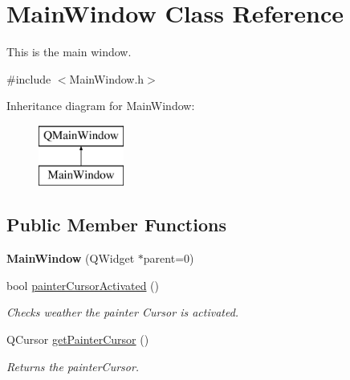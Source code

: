\hypertarget{class_main_window}{}\section{Main\+Window Class Reference}
\label{class_main_window}


This is the main window.  




{\ttfamily \#include $<$Main\+Window.\+h$>$}

Inheritance diagram for Main\+Window\+:\begin{figure}[H]
\begin{center}
\leavevmode
\includegraphics[height=2.000000cm]{class_main_window}
\end{center}
\end{figure}
\subsection*{Public Member Functions}
\begin{DoxyCompactItemize}
\item 
\hypertarget{class_main_window_a8b244be8b7b7db1b08de2a2acb9409db}{}{\bfseries Main\+Window} (Q\+Widget $\ast$parent=0)\label{class_main_window_a8b244be8b7b7db1b08de2a2acb9409db}

\item 
bool \hyperlink{class_main_window_a0f6f0466e2aca15edd6c820a686c6b57}{painter\+Cursor\+Activated} ()
\begin{DoxyCompactList}\small\item\em Checks weather the painter Cursor is activated. \end{DoxyCompactList}\item 
\hypertarget{class_main_window_aa0e9c2933778a0a94a2d2010b28ee0f2}{}Q\+Cursor \hyperlink{class_main_window_aa0e9c2933778a0a94a2d2010b28ee0f2}{get\+Painter\+Cursor} ()\label{class_main_window_aa0e9c2933778a0a94a2d2010b28ee0f2}

\begin{DoxyCompactList}\small\item\em Returns the painter\+Cursor. \end{DoxyCompactList}\end{DoxyCompactItemize}
